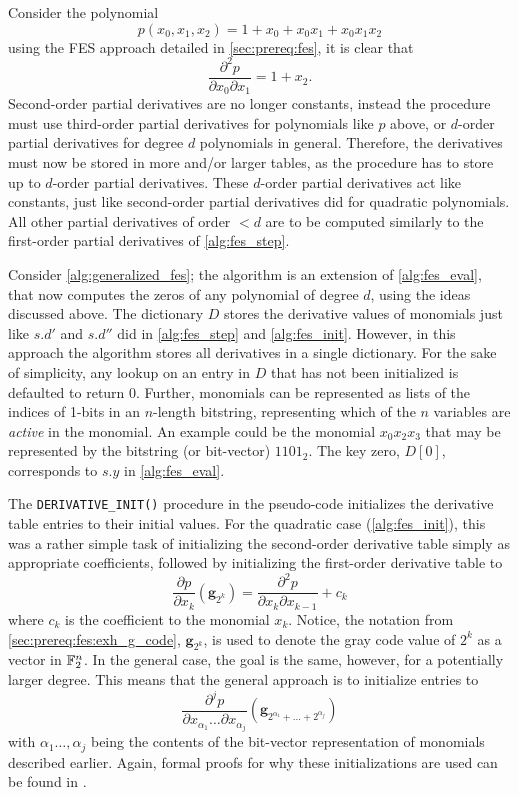 Consider the polynomial
$$
    p(x_0, x_1, x_2) = 1 + x_0 + x_0 x_1 + x_0 x_1 x_2
$$
using the FES approach detailed in \cref{sec:prereq:fes}, it is clear that 
$$
    \frac{\partial^2 p}{\partial x_0 \partial x_1} = 1 + x_2.
$$
Second-order partial derivatives are no longer constants, instead the procedure must use third-order partial derivatives for polynomials like $p$ above, or $d$-order partial derivatives for degree $d$ polynomials in general. Therefore, the derivatives must now be stored in more and/or larger tables, as the procedure has to store up to $d$-order partial derivatives. These $d$-order partial derivatives act like constants, just like second-order partial derivatives did for quadratic polynomials. All other partial derivatives of order $< d$ are to be computed similarly to the first-order partial derivatives of \cref{alg:fes_step}. 

Consider \cref{alg:generalized_fes}; the algorithm is an extension of \cref{alg:fes_eval}, that now computes the zeros of any polynomial of degree $d$, using the ideas discussed above. The dictionary $D$ stores the derivative values of monomials just like $s.d'$ and $s.d''$ did in \cref{alg:fes_step} and \cref{alg:fes_init}. However, in this approach the algorithm stores all derivatives in a single dictionary. For the sake of simplicity, any lookup on an entry in $D$ that has not been initialized is defaulted to return $0$. Further, monomials can be represented as lists of the indices of 1-bits in an $n$-length bitstring, representing which of the $n$ variables are \textit{active} in the monomial. An example could be the monomial $x_0x_2x_3$ that may be represented by the bitstring (or bit-vector) $1101_2$. The key zero, $D[0]$, corresponds to $s.y$ in \cref{alg:fes_eval}.

The \texttt{DERIVATIVE\_INIT()} procedure in the pseudo-code initializes the derivative table entries to their initial values. For the quadratic case (\cref{alg:fes_init}), this was a rather simple task of initializing the second-order derivative table simply as appropriate coefficients, followed by initializing the first-order derivative table to 
$$
    \frac{\partial p}{\partial x_k}(\mathbf{g}_{2^k}) = \frac{\partial^2 p}{\partial x_{k} \partial x_{k - 1}} + c_k
$$
where $c_k$ is the coefficient to the monomial $x_k$. Notice, the notation from \cref{sec:prereq:fes:exh_g_code}, $\mathbf{g}_{2^k}$, is used to denote the gray code value of $2^k$ as a vector in $\mathbb{F}_2^n$. In the general case, the goal is the same, however, for a potentially larger degree. This means that the general approach is to initialize entries to 
$$
    \frac{\partial^j p}{\partial x_{\alpha_1} \dots \partial x_{\alpha_j}}(\mathbf{g}_{2^{\alpha_1} + \dots + 2^{\alpha_j}})
$$
with $\alpha_1 \dots, \alpha_j$ being the contents of the bit-vector representation of monomials described earlier. Again, formal proofs for why these initializations are used can be found in \cite{tungchoumasters}.


